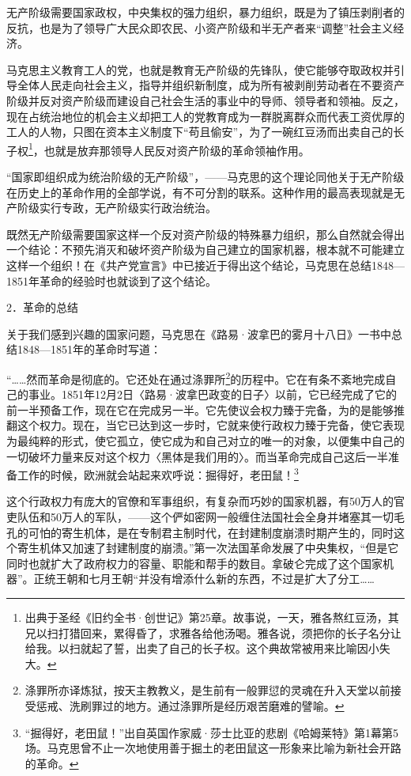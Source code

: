 \documentclass[UTF8, 12pt, a4paper]{ctexrep}
\begin{document}
无产阶级需要国家政权，中央集权的强力组织，暴力组织，既是为了镇压剥削者的反抗，也是为了领导广大民众即农民、小资产阶级和半无产者来“调整”社会主义经济。

马克思主义教育工人的党，也就是教育无产阶级的先锋队，使它能够夺取政权并引导全体人民走向社会主义，指导并组织新制度，成为所有被剥削劳动者在不要资产阶级并反对资产阶级而建设自己社会生活的事业中的导师、领导者和领袖。反之，现在占统治地位的机会主义却把工人的党教育成为一群脱离群众而代表工资优厚的工人的人物，只图在资本主义制度下“苟且偷安”，为了一碗红豆汤而出卖自己的长子权\footnote{出典于圣经《旧约全书·创世记》第25章。故事说，一天，雅各熬红豆汤，其兄以扫打猎回来，累得昏了，求雅各给他汤喝。雅各说，须把你的长子名分让给我。以扫就起了誓，出卖了自己的长子权。这个典故常被用来比喻因小失大。}，也就是放弃那领导人民反对资产阶级的革命领袖作用。

“国家即组织成为统治阶级的无产阶级”，——马克思的这个理论同他关于无产阶级在历史上的革命作用的全部学说，有不可分割的联系。这种作用的最高表现就是无产阶级实行专政，无产阶级实行政治统治。

既然无产阶级需要国家这样一个反对资产阶级的特殊暴力组织，那么自然就会得出一个结论：不预先消灭和破坏资产阶级为自己建立的国家机器，根本就不可能建立这样一个组织！在《共产党宣言》中已接近于得出这个结论，马克思在总结1848—1851年革命的经验时也就谈到了这个结论。

2．革命的总结

关于我们感到兴趣的国家问题，马克思在《路易·波拿巴的雾月十八日》一书中总结1848—1851年的革命时写道：

“……然而革命是彻底的。它还处在通过涤罪所\footnote{涤罪所亦译炼狱，按天主教教义，是生前有一般罪愆的灵魂在升入天堂以前接受惩戒、洗刷罪过的地方。通过涤罪所是经历艰苦磨难的譬喻。}的历程中。它在有条不紊地完成自己的事业。1851年12月2日〈路易·波拿巴政变的日子〉以前，它已经完成了它的前一半预备工作，现在它在完成另一半。它先使议会权力臻于完备，为的是能够推翻这个权力。现在，当它已达到这一步时，它就来使行政权力臻于完备，使它表现为最纯粹的形式，使它孤立，使它成为和自己对立的唯一的对象，以便集中自己的一切破坏力量来反对这个权力〈黑体是我们用的〉。而当革命完成自己这后一半准备工作的时候，欧洲就会站起来欢呼说：掘得好，老田鼠！\footnote{“掘得好，老田鼠！”出自英国作家威·莎士比亚的悲剧《哈姆莱特》第1幕第5场。马克思曾不止一次地使用善于掘土的老田鼠这一形象来比喻为新社会开路的革命。}

这个行政权力有庞大的官僚和军事组织，有复杂而巧妙的国家机器，有50万人的官吏队伍和50万人的军队，——这个俨如密网一般缠住法国社会全身并堵塞其一切毛孔的可怕的寄生机体，是在专制君主制时代，在封建制度崩溃时期产生的，同时这个寄生机体又加速了封建制度的崩溃。”第一次法国革命发展了中央集权，“但是它同时也就扩大了政府权力的容量、职能和帮手的数目。拿破仑完成了这个国家机器”。正统王朝和七月王朝“并没有增添什么新的东西，不过是扩大了分工……
\end{document}
